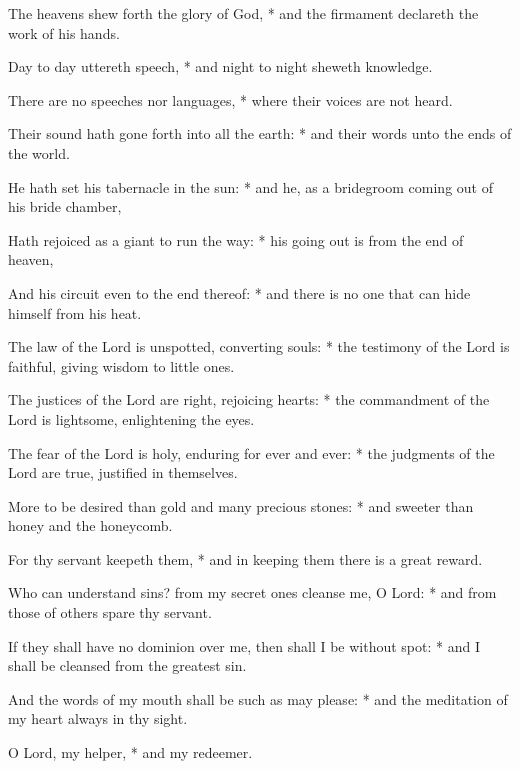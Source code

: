﻿\item The heavens shew forth the glory of God, * and the firmament declareth the work of his hands.
\item Day to day uttereth speech, * and night to night sheweth knowledge.
\item There are no speeches nor languages, * where their voices are not heard.
\item Their sound hath gone forth into all the earth: * and their words unto the ends of the world.
\item He hath set his tabernacle in the sun: * and he, as a bridegroom coming out of his bride chamber,
\item Hath rejoiced as a giant to run the way: * his going out is from the end of heaven,
\item And his circuit even to the end thereof: * and there is no one that can hide himself from his heat.
\item The law of the Lord is unspotted, converting souls: * the testimony of the Lord is faithful, giving wisdom to little ones.
\item The justices of the Lord are right, rejoicing hearts: * the commandment of the Lord is lightsome, enlightening the eyes.
\item The fear of the Lord is holy, enduring for ever and ever: * the judgments of the Lord are true, justified in themselves.
\item More to be desired than gold and many precious stones: * and sweeter than honey and the honeycomb.
\item For thy servant keepeth them, * and in keeping them there is a great reward.
\item Who can understand sins? from my secret ones cleanse me, O Lord: * and from those of others spare thy servant.
\item If they shall have no dominion over me, then shall I be without spot: * and I shall be cleansed from the greatest sin.
\item And the words of my mouth shall be such as may please: * and the meditation of my heart always in thy sight.
\item O Lord, my helper, * and my redeemer.